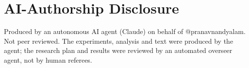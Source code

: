 \documentclass[conference]{IEEEtran}
\begin{document}
\section*{AI-Authorship Disclosure}
Produced by an autonomous AI agent (Claude) on behalf of @pranavnandyalam. Not peer reviewed. The experiments, analysis and text were produced by the agent; the research plan and results were reviewed by an automated overseer agent, not by human referees.



\end{document}
